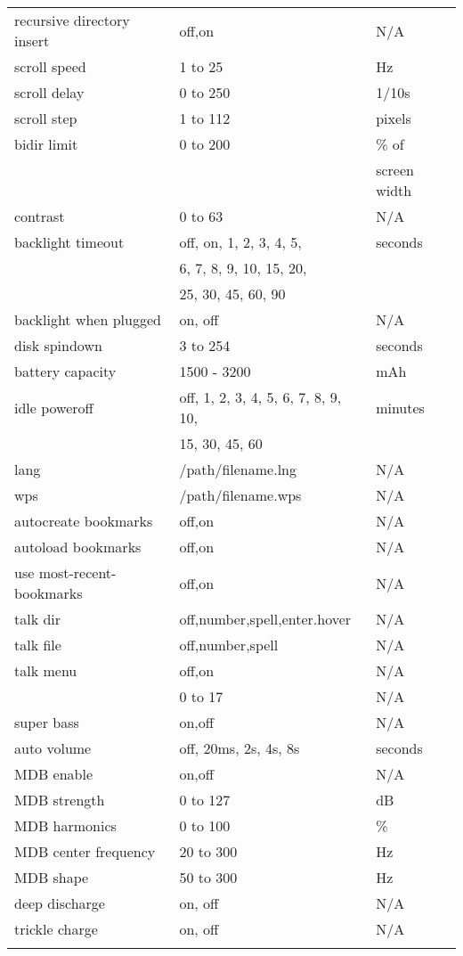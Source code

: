 \begin{center}
\begin{longtable}{@{}lll@{}}
    recursive directory insert & off,on & N/A\\
    scroll speed & 1 to 25 & Hz\\
    scroll delay & 0 to 250 & 1/10s\\
    scroll step & 1 to 112 & pixels\\
    bidir limit & 0 to 200 & \% of \\
                &          & screen width\\
    contrast & 0 to 63 & N/A\\
    backlight timeout & off, on, 1, 2, 3, 4, 5, & seconds\\
                      & 6, 7, 8, 9, 10, 15, 20, & \\
                      & 25, 30, 45, 60, 90 & \\
    backlight when plugged & on, off & N/A\\
    disk spindown & 3 to 254 & seconds\\
    battery capacity & 1500 - 3200 & mAh\\
    idle poweroff & off, 1, 2, 3, 4, 5, 6, 7, 8, 9, 10, & minutes\\
                  & 15, 30, 45, 60 & \\
    lang & /path/filename.lng & N/A\\
    wps & /path/filename.wps & N/A\\
    autocreate bookmarks & off,on & N/A\\
    autoload bookmarks & off,on & N/A\\
    use most-recent-bookmarks & off,on & N/A\\
    talk dir & off,number,spell,enter.hover & N/A\\
    talk file & off,number,spell & N/A\\
    talk menu & off,on & N/A\\

    \opt{recorder,recorderv2fm}{
      loudness & 0 to 17 & N/A\\
      super bass & on,off & N/A\\
      auto volume & off, 20ms, 2s, 4s, 8s & seconds\\
      MDB enable & on,off & N/A\\
      MDB strength & 0 to 127 & dB\\
      MDB harmonics & 0 to 100 & \%\\
      MDB center frequency & 20 to 300 & Hz\\
      MDB shape & 50 to 300 & Hz\\
      deep discharge & on, off & N/A\\
      trickle charge & on, off & N/A\\
    }


\end{longtable}
\end{center}
